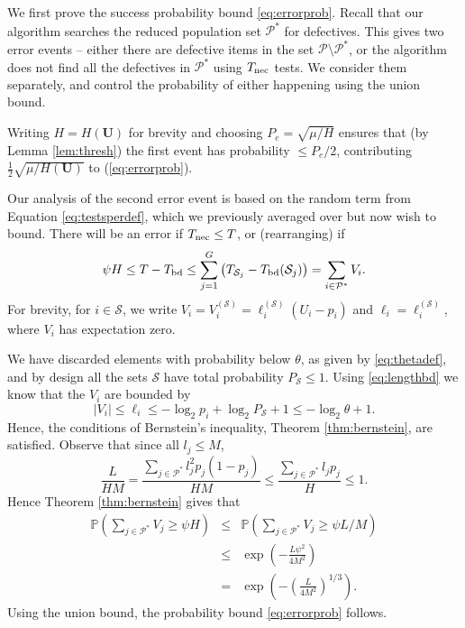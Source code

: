 \documentclass[conference]{IEEEtran}
\newcounter{eqn}
\newcommand{\vc}[1]{{\mathbf{ #1}}}
\newcommand{\pr}{{\mathbb{P}}}
\newcommand{\setS}{{\mathcal{S}}}
\newcommand{\setP}{{\mathcal{P}}}
\newcommand{\nec}{{\rm nec}}
\newcommand{\bd}{{\rm bd}}
\begin{document}
\begin{IEEEproof}
We first prove the success probability bound \eqref{eq:errorprob}.
 Recall that our algorithm searches the reduced population set $\setP^*$ for defectives.
This gives two  error events -- either there are defective items in the set $\setP \setminus \setP^*$, or the algorithm does not find all the defectives in $\setP^*$ using
$T_{\nec}$ tests. We consider them separately, and control the probability of either happening using the union bound.

Writing $H = H(\vc{U})$  for brevity and
choosing $ P_e = \sqrt{ \mu/H }$ ensures that (by Lemma \ref{lem:thresh}) the first event has probability $\leq P_e/2$, contributing 
$\frac{1}{2} \sqrt{ \mu/H(\vc{U})}$ to (\ref{eq:errorprob}).


Our analysis of the second error event is based on  the 
random term   from
Equation \eqref{eq:testsperdef}, which we previously averaged over but now wish to bound. There will be an error
if $T_{\nec} \leq T$, or (rearranging) if 
$$\psi H \leq T - T_{\bd} \leq \sum_{j=1}^G \left(T_{\setS_j} - T_{\bd}(\setS_j) \right) = \sum_{i \in \setP^*} V_i.$$  For brevity,   for $i \in \setS$, we write 
$V_i = V_ i^{(\setS)} = \ell_i^{(\setS)} (U_i - p_i)$ and $\ell_i = \ell_i^{(\setS)}$, where $V_i$ has expectation zero. 

We have discarded elements with probability below $\theta$, as given by \eqref{eq:thetadef}, and by design all the sets $\setS$ have total probability $P_{\setS} \leq 1$. Using
 \eqref{eq:lengthbd} we know that the $V_i$ are bounded by
\begin{equation} | V_i|  \leq \ell_i \leq -\log_2 p_i + \log_2 P_{\setS} + 1 \leq - \log_2 \theta + 1. \label{eq:vbd} \end{equation}
Hence, the conditions of Bernstein's inequality, Theorem \ref{thm:bernstein}, are satisfied. 
Observe that since all $l_j \leq M$,
$$ \frac{ L}{H M} = \frac{ \sum_{j \in \setP^*} l_j^2 p_j (1-p_j)} { H M} \leq \frac{ \sum_{j \in \setP^*} l_j p_j } { H} \leq 1 .$$
Hence Theorem \ref{thm:bernstein} gives that 
\begin{eqnarray*}
 \pr \left( \sum_{j \in \setP^*} V_j \geq \psi H \right) 
& \leq &
 \pr \left( \sum_{j \in \setP^*} V_j \geq \psi L/M \right) \\
& \leq &  \exp \left( - \frac{L \psi^2}{4  M^2 } \right) \\ 
& = & \exp \left( - \left( \frac{L}{4  M^2 }  \right)^{1/3}
\right).
\end{eqnarray*}
Using the union bound, the probability bound \eqref{eq:errorprob} follows.


\end{IEEEproof}
\end{document}
